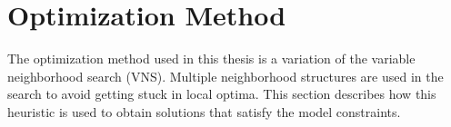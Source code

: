 
\newpage
\section{Optimization Method }
\label{chap:Optimization}


%

%
%
%

The optimization method used in this thesis is a variation of the variable neighborhood search (VNS).
Multiple neighborhood structures are used in the search to avoid getting stuck in local optima.
This section describes how this heuristic is used to obtain solutions that satisfy the model constraints. \\



